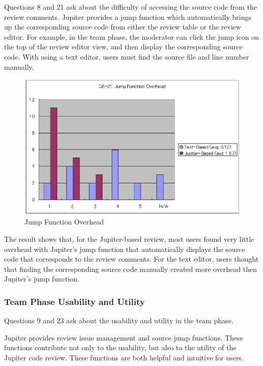 Questions 8 and 21 ask about the difficulty of accessing the source code from the review comments. Jupiter provides a jump function which automatically brings up the corresponding source code from either the review table or the review editor. For example, in the team phase, the moderator can click the jump icon on the top of the review editor view, and then display the corresponding source code.  With using a text editor, users must find the source file and line number manually.

\begin{figure}[htbp]
  \centering
  \includegraphics{images/fig5-10.eps}
  \caption{Jump Function Overhead}
  \label{fig5-10}
\end{figure}
 
The result shows that, for the Jupiter-based review, most users found very little overhead with Jupiter's jump function that automatically displays the source code that corresponds to the review comments. For the text editor, users thought that finding the corresponding source code manually created more overhead then Jupiter's jump function.

\subsubsection{Team Phase Usability and Utility}
\label{subsubsec:team-phase-usability-and-utility}

Questions 9 and 23 ask about the usability and utility in the team phase.

Jupiter provides review issue management and source jump functions. These functions contribute not only to the usability, but also to the utility of the Jupiter code review. These functions are both helpful and intuitive for users.


